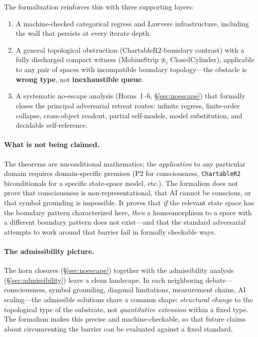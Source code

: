 \documentclass[11pt]{article}
\begin{document}
The formalization reinforces this with three supporting layers:

\begin{enumerate}[label=(\roman*)]
\item A machine-checked categorical regress and Lawvere infrastructure,
  including the  wall that persists at every
  iterate depth.
\item A general topological obstruction
  ($\mathrm{ChartableR2}$-boundary contrast) with a fully discharged
  compact witness
  ($\mathrm{MobiusStrip} \not\simeq_t \mathrm{ClosedCylinder}$),
  applicable to any pair of spaces with incompatible boundary
  topology---the obstacle is \textbf{wrong type}, not
  \textbf{inexhaustible queue}.
\item A systematic no-escape analysis (Horns~1--6,
  \S\ref{sec:noescape}) that formally closes the principal adversarial
  retreat routes: infinite regress, finite-order collapse, cross-object
  readout, partial self-models, model substitution, and decidable
  self-reference.
\end{enumerate}

\paragraph{What is not being claimed.}
The theorems are unconditional mathematics; the \emph{application} to
any particular domain requires domain-specific premises (P2 for
consciousness, \texttt{ChartableR2} biconditionals for a specific
state-space model, etc.).  The formalism does not prove that
consciousness is non-representational, that AI cannot be conscious, or
that symbol grounding is impossible.  It proves that \emph{if} the
relevant state space has the boundary pattern characterized here,
\emph{then} a homeomorphism to a space with a different boundary
pattern does not exist---and that the standard adversarial attempts to
work around that barrier fail in formally checkable ways.

\paragraph{The admissibility picture.}
The horn closures (\S\ref{sec:noescape}) together with the
admissibility analysis (\S\ref{sec:admissibility}) leave a clean
landscape.  In each neighboring debate---consciousness,
symbol grounding, diagonal limitations, measurement chains, AI
scaling---the admissible solutions share a common shape:
\emph{structural change} to the topological type of the substrate,
not \emph{quantitative extension} within a fixed type.  The formalism
makes this precise and machine-checkable, so that future claims about
circumventing the barrier can be evaluated against a fixed standard.
\end{document}
